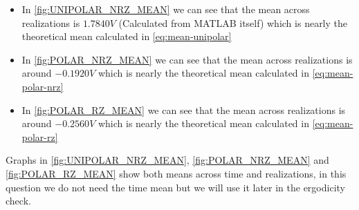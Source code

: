 \begin{itemize}
    \item In \autoref{fig:UNIPOLAR_NRZ_MEAN} we can see that the mean across realizations
          is $1.7840 V$ (Calculated from MATLAB itself) which is nearly the theoretical mean calculated in
          \autoref{eq:mean-unipolar}
    \item In \autoref{fig:POLAR_NRZ_MEAN} we can see that the mean across realizations is
          around $ -0.1920 V $ which is nearly the theoretical mean calculated in
          \autoref{eq:mean-polar-nrz}
    \item In \autoref{fig:POLAR_RZ_MEAN} we can see that the mean across realizations is
          around $-0.2560 V$ which is nearly the theoretical mean calculated in
          \autoref{eq:mean-polar-rz}
\end{itemize}

\begin{block}[note]
    Graphs in \autoref{fig:UNIPOLAR_NRZ_MEAN}, \autoref{fig:POLAR_NRZ_MEAN} and \autoref{fig:POLAR_RZ_MEAN} show both means across time and realizations, in this question we do not need the time mean but we will use it later in the ergodicity check.
\end{block}
